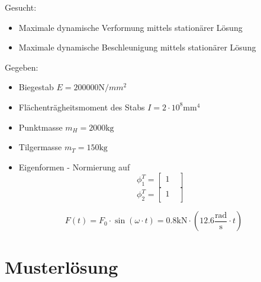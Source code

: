 \documentclass[
  letterpaper,
  DIV=11]{scrreprt}
\providecommand{\tightlist}{%
  \setlength{\itemsep}{0pt}\setlength{\parskip}{0pt}}\usepackage{longtable,booktabs,array}
\begin{document}
Gesucht:

\begin{itemize}
\tightlist
\item
  Maximale dynamische Verformung mittels stationärer Lösung
\item
  Maximale dynamische Beschleunigung mittels stationärer Lösung
\end{itemize}

Gegeben:

\begin{itemize}
\tightlist
\item
  Biegestab \(E = 200000 \text{N}/{mm}^2\)
\item
  Flächenträgheitsmoment des Stabs \(I = 2 \cdot 10^8 \text{mm}^4\)
\item
  Punktmasse \(m_H = 2000 \text{kg}\)
\item
  Tilgermasse \(m_T = 150 \text{kg}\)
\item
  Eigenformen - Normierung auf \[\phi_1^T = 
  \begin{bmatrix}
   1 &  \\
  \end{bmatrix} \] \[\phi_2^T =
  \begin{bmatrix}
   1 &  \\
  \end{bmatrix}\]
\end{itemize}

\[
F(t) = F_0 \cdot \sin(\omega\cdot t) = 0.8 \text{kN} \cdot (12.6 \frac{\text{rad}}{\text{s}}\cdot t)
\]

\newpage{}

\hypertarget{musterluxf6sung-10}{%
\section{Musterlösung}\label{musterluxf6sung-10}}
\end{document}
